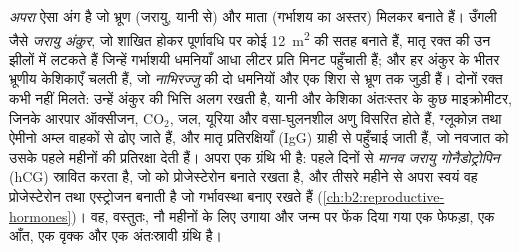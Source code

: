 \begin{definition}[अपरा]\label{def:b2:mammal-reproduction:placenta}
\emph{अपरा} ऐसा अंग है जो भ्रूण (जरायु, यानी
 से) और माता (गर्भाशय का अस्तर) मिलकर बनाते हैं।
उँगली जैसे \emph{जरायु अंकुर}, जो शाखित होकर पूर्णावधि पर कोई
\qty{12}{m^2} की सतह बनाते हैं, मातृ रक्त की उन झीलों में लटकते हैं
जिन्हें गर्भाशयी धमनियाँ आधा लीटर प्रति मिनट पहुँचाती हैं; और हर अंकुर
के भीतर भ्रूणीय केशिकाएँ चलती हैं, जो \emph{नाभिरज्जु} की दो धमनियों और
एक शिरा से भ्रूण तक जुड़ी हैं। दोनों रक्त कभी नहीं मिलते:
उन्हें अंकुर की भित्ति अलग रखती है, यानी  और केशिका अंतःस्तर के
कुछ माइक्रोमीटर, जिनके आरपार ऑक्सीजन,
$\mathrm{CO_2}$, जल, यूरिया और वसा-घुलनशील अणु विसरित होते हैं,
ग्लूकोज़ तथा ऐमीनो अम्ल वाहकों से ढोए जाते हैं, और मातृ
प्रतिरक्षियाँ (IgG) ग्राही से पहुँचाई जाती हैं, जो नवजात को उसके पहले
महीनों की प्रतिरक्षा देती हैं। अपरा एक ग्रंथि भी है: पहले
दिनों से  \emph{मानव जरायु
गोनैडोट्रोपिन} (hCG) स्रावित करता है, जो  को
प्रोजेस्टेरोन बनाते रखता है, और तीसरे महीने से अपरा स्वयं वह
प्रोजेस्टेरोन तथा एस्ट्रोजन बनाती है जो गर्भावस्था बनाए रखते हैं
(\cref{ch:b2:reproductive-hormones})। वह, वस्तुतः, नौ महीनों के लिए उगाया
और जन्म पर फेंक दिया गया एक फेफड़ा, एक आँत, एक वृक्क और एक अंतःस्रावी
ग्रंथि है।
\end{definition}

